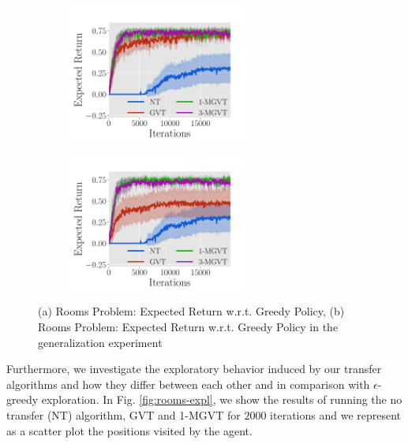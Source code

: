 \documentclass{article}
\begin{document}
\begin{figure}[t]
  \begin{subfigure}[b]{0.45\textwidth}
    \includegraphics[trim=0.3cm 0cm 1.8cm 1.3cm,clip=true,height=4.5cm]{images/three-room/erew.pdf}
    \caption{}
    \label{fig:3r-erew}
  \end{subfigure}
  \begin{subfigure}[b]{0.45\textwidth}
    \includegraphics[trim=0.3cm 0cm 1.8cm 1.3cm,clip=true,height=4.5cm]{images/three-room-gen/erew.pdf}
    \caption{}
    \label{fig:3rg-erew}
  \end{subfigure}
  \caption{(a) Rooms Problem: Expected Return w.r.t. Greedy Policy, (b) Rooms Problem: Expected Return w.r.t. Greedy Policy in the generalization experiment}
  \label{fig:rooms-erew}
\end{figure}

Furthermore, we investigate the exploratory behavior induced by our transfer algorithms and how they differ between each other and in comparison with $\epsilon$-greedy exploration. In Fig. \ref{fig:rooms-expl}, we show the results of running the no transfer (NT) algorithm, GVT and 1-MGVT for $2000$ iterations and we represent as a scatter plot the positions visited by the agent.
\end{document}

